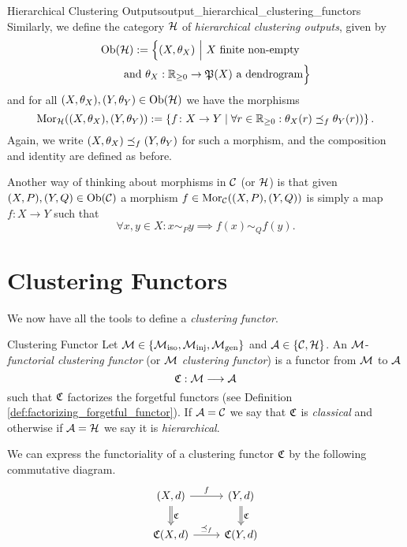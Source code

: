 \begin{definition}{Hierarchical Clustering Outputs\cite[Def.~3.3]{Carlsson2010}}{output_hierarchical_clustering_functors}
Similarly, we define the category $\mathcal{H}$ of \emph{hierarchical clustering outputs}, given by
\begin{equation*}
\begin{multlined}[c][.8\displaywidth]
    \ob(\H) := \Big\{(X, \theta_X) \ \Big\vert \ X \text{ finite non-empty} \\ \text{and } \theta_X: \R_{\geq0} \to \P(X) \ \text{a dendrogram}\Big\}
\end{multlined}
\end{equation*}
and for all $(X, \theta_X), (Y, \theta_Y) \in \mathrm {Ob}(\mathcal{H})$ we have the morphisms
\begin{equation*}
    \mathrm {Mor}_{\mathcal{H}}((X, \theta_X), (Y,\theta_Y)) :=
    \left\{f\colon X \to Y\mid \forall r \in \mathbb R_{\geq0}: \theta_X(r) \preceq_f \theta_Y(r)) \right\}.
\end{equation*}
Again, we write $(X, \theta_X) \preceq_f (Y, \theta_Y)$ for such a morphism, and the composition and identity are defined as before.
\end{definition}

Another way of thinking about morphisms in $\mathcal{C}$ (or $\mathcal{H}$) is that given ${(X,P), (Y,Q) \in \mathrm {Ob}(\mathcal{C})}$ a morphism $f \in \mathrm {Mor}_{\mathcal{C}}((X,P), (Y,Q))$ is simply a map $f\colon X \to Y$ such that
$$
\forall x,y \in X: x \sim_P y \implies f(x) \sim_Q f(y).
$$

\section{Clustering Functors}
We now have all the tools to define a \emph{clustering functor}.

\begin{definition}{Clustering Functor \cite[Sec.~4.1]{Carlsson2010}}{}
Let $\mathcal{M} \in \{{\mathcal{M}_\mathrm{iso}}, {\mathcal{M}_\mathrm{inj}}, {\mathcal{M}_\mathrm{gen}}\}$ and $\mathcal{A} \in \{\mathcal{C}, \mathcal{H}\}$. An $\mathcal{M}$-\emph{functorial clustering functor} (or $\mathcal{M}$ \emph{clustering functor}) is a functor from $\mathcal{M}$ to $\mathcal{A}$
$$\mathfrak{C} : \mathcal{M} \longrightarrow \mathcal{A}$$
such that $\mathfrak{C}$ factorizes the forgetful functors (see Definition \ref{def:factorizing_forgetful_functor}). If $\mathcal{A} = \mathcal{C}$ we say that $\mathfrak{C}$ is \emph{classical} and otherwise if $\mathcal{A} = \mathcal{H}$ we say it is \emph{hierarchical}.
\end{definition}

We can express the functoriality of a clustering functor $\mathfrak{C}$ by the following commutative diagram.
\begin{equation*}
    \begin{tikzcd}
    {(X,d)} \arrow[r, "f"] \arrow[d, "\Cf", Rightarrow] & {(Y,d)} \arrow[d, "\Cf", Rightarrow] \\
    {\Cf(X,d)} \arrow[r, "\refines_f"]                  & {\Cf(Y,d)}
    \end{tikzcd}
\end{equation*}

